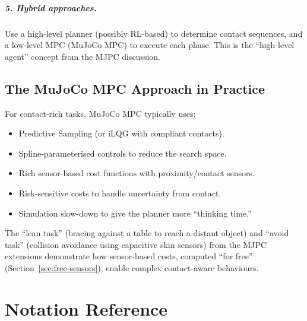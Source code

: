 \documentclass[11pt,twoside]{report}
\theoremstyle{definition}
\theoremstyle{plain}
\theoremstyle{remark}
\newcommand{\0}{\bm{0}}
\begin{document}
\paragraph{5. Hybrid approaches.}
Use a high-level planner (possibly RL-based) to determine contact
sequences, and a low-level MPC (MuJoCo MPC) to execute each phase.
This is the ``high-level agent'' concept from the MJPC discussion.

\section{The MuJoCo MPC Approach in Practice}

For contact-rich tasks, MuJoCo MPC typically uses:
\begin{itemize}
\item Predictive Sampling (or iLQG with compliant contacts).
\item Spline-parameterised controls to reduce the search space.
\item Rich sensor-based cost functions with proximity/contact sensors.
\item Risk-sensitive costs to handle uncertainty from contact.
\item Simulation slow-down to give the planner more ``thinking time.''
\end{itemize}

The ``lean task'' (bracing against a table to reach a distant object)
and ``avoid task'' (collision avoidance using capacitive skin sensors)
from the MJPC extensions demonstrate how sensor-based costs,
computed ``for free'' (Section~\ref{sec:free-sensors}), enable
complex contact-aware behaviours.


\appendix
\chapter{Notation Reference}
\end{document}

